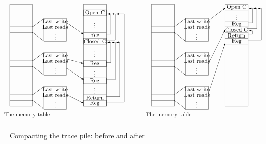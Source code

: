 \documentclass{acm_proc_article-sp}
\begin{document}
\newcommand{\backlink}[3]
{\begin{picture}(#1,#2)
\put(0,0){\line(1,0){#1}}
\put(#1,0){\line(0,1){#2}}
\put(#1,#2){\vector(-1,0){#3}}
\end{picture}}

\newcommand{\rwblock}
{\begin{picture}(100,40)(-40,0)
\put(0,25){\line(4,3){20}}
\put(0,15){\line(4,-3){20}}
\put(-40,25){\line(1,0){40}}
\put(-40,15){\line(1,0){40}}
\put(20,0){\framebox(40,40){\ }}
\put(20,30){\line(1,0){40}}
\put(20,30){\makebox(40,10){Last write}}
\put(20,20){\makebox(40,10){Last reads}}
\put(20,5){\makebox(40,10){\vdots}}
\end{picture}}
\begin{figure*}
\small
\hrulefill
\[
\begin{picture}(250,210)(-30,0)
\put(-30,30){\framebox(40,180)[t]{\ }}
\put(-30,10){\makebox(60,10){The memory table}}
\put(-30,145){\rwblock}
\put(70,177){\vector(3,-2){30}}
\put(-30,85){\rwblock}
\put(70,113){\vector(4,-1){30}}
\put(70,97){\vector(3,-2){30}}
\put(-30,25){\rwblock}
\put(70,50){\vector(2,-1){30}}
\put(100,30){\framebox(40,180)[t]{\ }}
\put(100,190){\framebox(40,10){Open C}}
\put(100,170){\makebox(40,10){\vdots}}
\put(100,160){\line(1,0){40}}
\put(100,150){\makebox(40,10){Reg}}
\put(140,157){\backlink{8}{36}{6}}
\put(100,140){\framebox(40,10){Closed C}}
\put(140,147){\backlink{16}{46}{6}}
\put(100,120){\makebox(40,10){\vdots}}
\put(100,100){\framebox(40,10){Reg}}
\put(140,107){\backlink{8}{36}{6}}
\put(100,85){\makebox(40,10){\vdots}}
\put(100,70){\framebox(40,10){Reg}}
\put(140,77){\backlink{16}{66}{6}}
\put(100,50){\line(1,0){40}}
\put(100,55){\makebox(40,10){\vdots}}
\put(100,40){\makebox(40,10){Return}}
\put(140,47){\backlink{24}{96}{6}}
\put(100,30){\framebox(40,10){Reg}}
\put(140,37){\backlink{32}{156}{14}}
\end{picture}
%
%
\begin{picture}(200,210)(-30,0)
\put(-30,30){\framebox(40,180)[t]{\ }}
\put(-30,10){\makebox(60,10){The memory table}}
\put(-30,145){\rwblock}
\put(70,181){\vector(4,3){30}}
\put(-30,85){\rwblock}
\put(70,105){\vector(1,2){30}}
\put(-30,25){\rwblock}
\put(70,52){\vector(1,3){30}}
\put(100,30){\framebox(40,180)[t]{\ }}
\put(100,200){\makebox(40,10){Open C}}
\put(100,200){\line(1,0){40}}
\put(100,185){\makebox(40,10){\vdots}}
\put(100,170){\framebox(40,10){Reg}}
\put(140,177){\backlink{8}{26}{6}}
\put(100,160){\makebox(40,10){Closed C}}
\put(140,167){\backlink{16}{36}{6}}
\put(100,150){\framebox(40,10){Return}}
\put(140,157){\backlink{8}{6}{6}}
\put(100,140){\makebox(40,10){Reg}}
\put(140,147){\backlink{24}{56}{6}}
\put(100,140){\line(1,0){40}}
\end{picture}
\]
\hrulefill
\caption{Compacting the trace pile: before and after}
\label{fnyembladata}
\end{figure*}
\end{document}

